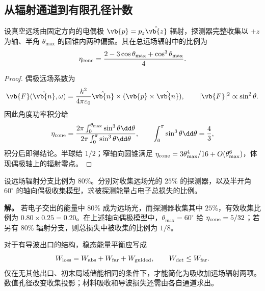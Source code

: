 \subsection{从辐射通道到有限孔径计数}
\label{chap:feqo-cl}

\begin{proposition}[偶极轴向圆锥的收集比例]
设真空远场由固定方向的电偶极 $\vb{p}=p_z\hat{\vb{z}}$ 辐射，探测器完整收集以 $+z$ 为轴、半角 $\theta_{\max}$ 的圆锥内两种偏振。其在总远场辐射中的比例为
\begin{equation}
\eta_{\rm cone}
=\frac{2-3\cos\theta_{\max}+\cos^3\theta_{\max}}4.
\label{eq:feqo-dipole-collection-fraction}
\end{equation}
\end{proposition}
\begin{proof}
偶极远场系数为
\[
\vb{F}(\hat{\vb{n}},\omega)
=\frac{k^2}{4\pi\varepsilon_0}
\hat{\vb{n}}\times(\vb{p}\times\hat{\vb{n}}),
\qquad |\vb{F}|^2\propto\sin^2\theta.
\]
因此角度功率积分给
\[
\eta_{\rm cone}
=\frac{2\pi\int_0^{\theta_{\max}}\sin^3\theta\dd\theta}
{2\pi\int_0^\pi\sin^3\theta\dd\theta},
\qquad\int_0^\pi\sin^3\theta\dd\theta=\frac43,
\]
积分后即得结论。半球给 $1/2$；窄轴向圆锥满足 $\eta_{\rm cone}=3\theta_{\max}^4/16+O(\theta_{\max}^6)$，体现偶极轴上的辐射零点。
\end{proof}

\begin{workedexample}[辐射分支与孔径效率]
设远场辐射分支比例为 $80\%$。分别对收集远场光的 $25\%$ 的探测器，以及半开角 $60^\circ$ 的轴向偶极收集模型，求被探测能量占电子总损失的比例。

\textbf{解。} 若电子交出的能量中 $80\%$ 成为远场光，而探测器收集其中 $25\%$，有效收集比例为 $0.80\times0.25=0.20$。在上述轴向偶极模型中，$\theta_{\max}=60^\circ$ 给 $\eta_{\rm cone}=5/32$；若另有 $80\%$ 辐射分支，则总损失中被收集的比例为 $1/8$。

对于有导波出口的结构，稳态能量平衡应写成
\[
W_{\rm loss}=W_{\rm abs}+W_{\rm far}+W_{\rm guided},
\qquad W_{\rm det}\le W_{\rm far}.
\]
仅在无其他出口、初末局域储能相同的条件下，才能简化为吸收加远场辐射两项。数值孔径改变收集投影；材料吸收和导波损失还需由各自通道求出。
\end{workedexample}
